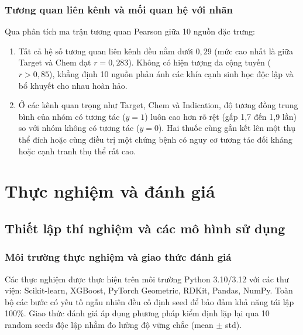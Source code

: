 \documentclass[12pt,a4paper,oneside]{report}
\begin{document}
\subsection{Tương quan liên kênh và mối quan hệ với nhãn}
Qua phân tích ma trận tương quan Pearson giữa 10 nguồn đặc trưng:
\begin{enumerate}
  \item Tất cả hệ số tương quan liên kênh đều nằm dưới $0{,}29$ (mức cao nhất là giữa Target và Chem đạt $r=0{,}283$). Không có hiện tượng đa cộng tuyến ($r > 0{,}85$), khẳng định 10 nguồn phản ánh các khía cạnh sinh học độc lập và bổ khuyết cho nhau hoàn hảo.
  \item Ở các kênh quan trọng như Target, Chem và Indication, độ tương đồng trung bình của nhóm có tương tác ($y=1$) luôn cao hơn rõ rệt (gấp 1,7 đến 1,9 lần) so với nhóm không có tương tác ($y=0$). Hai thuốc cùng gắn kết lên một thụ thể đích hoặc cùng điều trị một chứng bệnh có nguy cơ tương tác đối kháng hoặc cạnh tranh thụ thể rất cao.
\end{enumerate}

\chapter{Thực nghiệm và đánh giá}
\label{chap:thucnghiem}

\section{Thiết lập thí nghiệm và các mô hình sử dụng}

\subsection{Môi trường thực nghiệm và giao thức đánh giá}
Các thực nghiệm được thực hiện trên môi trường Python 3.10/3.12 với các thư viện: Scikit-learn, XGBoost, PyTorch Geometric, RDKit, Pandas, NumPy. Toàn bộ các bước có yếu tố ngẫu nhiên đều cố định seed để bảo đảm khả năng tái lập 100\%. Giao thức đánh giá áp dụng phương pháp kiểm định lặp lại qua 10 random seeds độc lập nhằm đo lường độ vững chắc (mean $\pm$ std).
\end{document}

